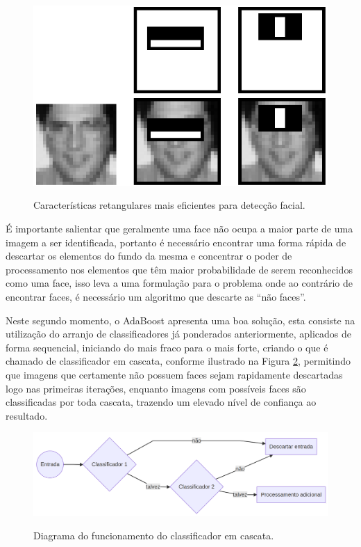 \begin{figure}[htb]
    \centering
    \caption{Características retangulares mais eficientes para detecção facial.}
    \includegraphics[scale=.4]{figs/top-features.png}
    \label{fig:top-features}
\end{figure}

É importante salientar que geralmente uma face não ocupa a maior parte de uma imagem a ser identificada, portanto é necessário encontrar uma forma rápida de descartar os elementos do fundo da mesma e concentrar o poder de processamento nos elementos que têm maior probabilidade de serem reconhecidos como uma face, isso leva a uma formulação para o problema onde ao contrário de encontrar faces, é necessário um algoritmo que descarte as ``não faces''.

Neste segundo momento, o AdaBoost apresenta uma boa solução, esta consiste na utilização do arranjo de classificadores já ponderados anteriormente, aplicados de forma sequencial, iniciando do mais fraco para o mais forte, criando o que é chamado de classificador em cascata, conforme ilustrado na Figura \ref{fig:cascade-classifier}, permitindo que imagens que certamente não possuem faces sejam rapidamente descartadas logo nas primeiras iterações, enquanto imagens com possíveis faces são classificadas por toda cascata, trazendo um elevado nível de confiança ao resultado.

\begin{figure}[htb]
    \centering
    \caption{Diagrama do funcionamento do classificador em cascata.}
    \includegraphics[scale=.2]{figs/cascade-classifier.png}
    \label{fig:cascade-classifier}
\end{figure}

